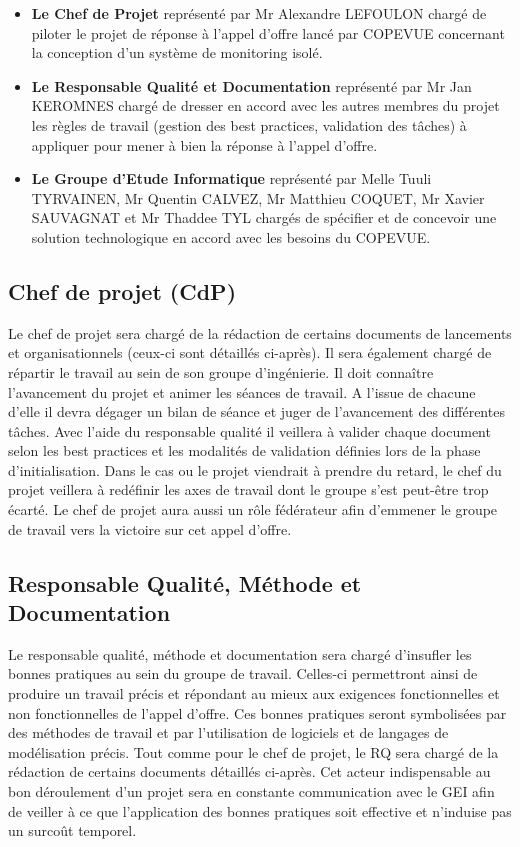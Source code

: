 \begin{itemize}
\item \textbf{Le Chef de Projet} représenté par Mr Alexandre LEFOULON chargé de piloter le projet de réponse à l'appel d'offre lancé par COPEVUE concernant la conception d'un système de monitoring isolé.
\item \textbf{Le Responsable Qualité et Documentation} représenté par Mr Jan KEROMNES chargé de dresser en accord avec les autres membres du projet les règles de travail (gestion des best practices, validation des tâches) à appliquer pour mener à bien la réponse à l'appel d'offre.
\item \textbf{Le Groupe d'Etude Informatique} représenté par Melle Tuuli TYRVAINEN, Mr Quentin CALVEZ, Mr Matthieu COQUET, Mr Xavier SAUVAGNAT et Mr Thaddee TYL chargés de spécifier et de concevoir une solution technologique en accord avec les besoins du COPEVUE.
\end{itemize}

    
    \subsection{Chef de projet (CdP)}

Le chef de projet sera chargé de la rédaction de certains documents de lancements et organisationnels (ceux-ci sont détaillés ci-après). Il sera également chargé de répartir le travail au sein de son groupe d'ingénierie. Il doit connaître l'avancement du projet et animer les séances de travail. A l'issue de chacune d'elle il devra dégager un bilan de séance et juger de l'avancement des différentes tâches. Avec l'aide du responsable qualité il veillera à valider chaque document selon les best practices et les modalités de validation définies lors de la phase d'initialisation. Dans le cas ou le projet viendrait à prendre du retard, le chef du projet veillera à redéfinir les axes de travail dont le groupe s'est peut-être trop écarté. Le chef de projet aura aussi un rôle fédérateur afin d'emmener le groupe de travail vers la victoire sur cet appel d'offre.

    \subsection{Responsable Qualité, Méthode et Documentation}

Le responsable qualité, méthode et documentation sera chargé d'insufler les bonnes pratiques au sein du groupe de travail. Celles-ci permettront ainsi de produire un travail précis et répondant au mieux aux exigences fonctionnelles et non fonctionnelles de l'appel d'offre. Ces bonnes pratiques seront symbolisées par des méthodes de travail et par l'utilisation de logiciels et de langages de modélisation précis. Tout comme pour le chef de projet, le RQ sera chargé de la rédaction de certains documents détaillés ci-après. Cet acteur indispensable au bon déroulement d'un projet sera en constante communication avec le GEI afin de veiller à ce que l'application des bonnes pratiques soit effective et n'induise pas un surcoût temporel.

